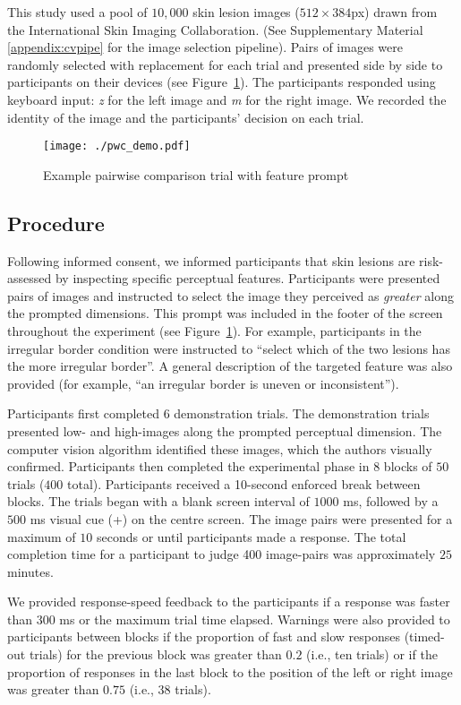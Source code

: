 \documentclass[
    man, 12pt, a4paper,
    donotrepeattitle, floatsintext, draftfirst
]{apa7}
\begin{document}
This study used a pool of $10,000$ skin lesion images ($512\times384$px) drawn from the International Skin Imaging Collaboration. (See Supplementary Material \ref{appendix:cvpipe} for the image selection pipeline). Pairs of images were randomly selected with replacement for each trial and presented side by side to participants on their devices (see Figure~\ref{fig:pwc_demo}). The participants responded using keyboard input: \textit{z} for the left image and \textit{m} for the right image. We recorded the identity of the image and the participants' decision on each trial.

\begin{figure}[htb]
    \caption{Example pairwise comparison trial with feature prompt}
    \centering
    \texttt{[image: ./pwc\_demo.pdf]}
    \label{fig:pwc_demo}
\end{figure}

\subsection{Procedure}
Following informed consent, we informed participants that skin lesions are risk-assessed by inspecting specific perceptual features. Participants were presented pairs of images and instructed to select the image they perceived as \textit{greater} along the prompted dimensions. This prompt was included in the footer of the screen throughout the experiment (see Figure~\ref{fig:pwc_demo}). For example, participants in the irregular border condition were instructed to ``select which of the two lesions has the more irregular border''. A general description of the targeted feature was also provided (for example, ``an irregular border is uneven or inconsistent'').

Participants first completed $6$ demonstration trials. The demonstration trials presented low- and high-images along the prompted perceptual dimension. The computer vision algorithm identified these images, which the authors visually confirmed. Participants then completed the experimental phase in $8$ blocks of $50$ trials ($400$ total). Participants received a 10-second enforced break between blocks. The trials began with a blank screen interval of $1000$ ms, followed by a $500$ ms visual cue (+) on the centre screen.
The image pairs were presented for a maximum of $10$ seconds or until participants made a response.
The total completion time for a participant to judge 400 image-pairs was approximately $25$ minutes.

We provided response-speed feedback to the participants if a response was faster than $300$ ms or the maximum trial time elapsed. Warnings were also provided to participants between blocks if the proportion of fast and slow responses (timed-out trials) for the previous block was greater than $0.2$ (i.e., ten trials) or if the proportion of responses in the last block to the position of the left or right image was greater than $0.75$ (i.e., 38 trials).
\end{document}
